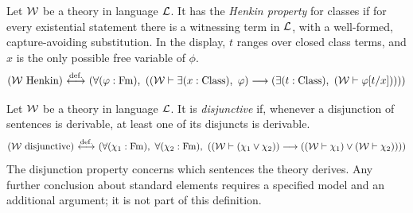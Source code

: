 \begin{definition}%
Let ${\mathcal{W}}$ be a theory in language ${\mathcal{L}}$.
It has the \textit{Henkin property} for classes if %
for every existential statement there is a witnessing term %
in ${\mathcal{L}}$, with a well-formed, capture-avoiding substitution. In the display,
$t$ ranges over closed class terms, and $x$ is the only possible free variable
of $\phi$.%
\[
(\Wau\text{ Henkin})
\iffdef
(\forall (\phi:\Fm),\ %
(
(\Wau \vdash \exists (x:\Class),\ \phi)
\implies
(\exists (t:\Class),\ (\Wau \vdash \phi[t/x])))%
)
\]
\end{definition}
\begin{definition}
Let ${\mathcal{W}}$ be a theory in language ${\mathcal{L}}$.
It is \textit{disjunctive} if, whenever a disjunction of sentences is
derivable, at least one of its disjuncts is derivable.
\[
(\Wau\text{ disjunctive})
\iffdef
(
\forall (\chi_1:\Fm),\ %
\forall (\chi_2:\Fm),\ %
((\Wau \vdash (\chi_1\lor\chi_2))
\implies
(
(\Wau \vdash \chi_1)
\lor 
(\Wau \vdash \chi_2)
))
)
\]
The disjunction property concerns which sentences the theory derives. Any
further conclusion about standard elements requires a specified model and an
additional argument; it is not part of this definition.
\end{definition}

